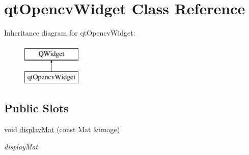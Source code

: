 \hypertarget{classqt_opencv_widget}{}\section{qt\+Opencv\+Widget Class Reference}
\label{classqt_opencv_widget}
Inheritance diagram for qt\+Opencv\+Widget\+:\begin{figure}[H]
\begin{center}
\leavevmode
\includegraphics[height=2.000000cm]{classqt_opencv_widget}
\end{center}
\end{figure}
\subsection*{Public Slots}
\begin{DoxyCompactItemize}
\item 
void \hyperlink{classqt_opencv_widget_abe980a492d8c367a0401c01e11a9f85c}{display\+Mat} (const Mat \&image)
\begin{DoxyCompactList}\small\item\em display\+Mat \end{DoxyCompactList}\end{DoxyCompactItemize}
